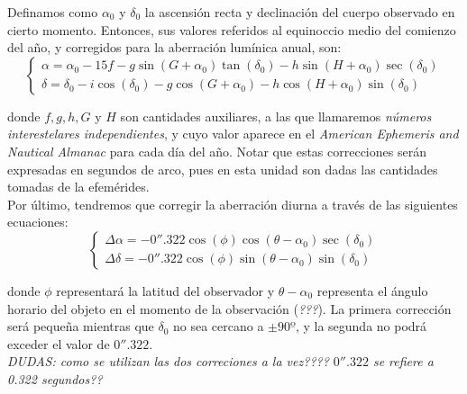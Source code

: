 \documentclass[11pt]{article}
\begin{document}
Definamos como $\alpha_0$ y $\delta_0$ la ascensión recta y declinación del cuerpo observado en cierto momento. Entonces, sus valores referidos al equinoccio medio del comienzo del año, y corregidos para la aberración lumínica anual, son:
\[
\left\{
\begin{array}{l}
	\alpha = \alpha_0 - 15f - g \sin(G+\alpha_0) \tan(\delta_0) - h \sin(H+\alpha_0) \sec(\delta_0)\\
	\delta = \delta_0 - i \cos(\delta_0) - g \cos(G+\alpha_0) - h \cos(H+\alpha_0) \sin(\delta_0)
\end{array}
\right.
\]

\noindent donde $f, g, h, G$ y $H$ son cantidades auxiliares, a las que llamaremos \textit{números interestelares independientes}, y cuyo valor aparece en el \textit{American Ephemeris and Nautical Almanac} para cada día del año. Notar que estas correcciones serán expresadas en segundos de arco, pues en esta unidad son dadas las cantidades tomadas de la efemérides.\\

Por último, tendremos que corregir la aberración diurna a través de las siguientes ecuaciones:
\[
\left\{
\begin{array}{l}
	\Delta \alpha = -0''.322 \cos(\phi) \cos(\theta - \alpha_0) \sec(\delta_0)\\
	\Delta \delta = -0''.322 \cos(\phi) \sin(\theta - \alpha_0) \sin(\delta_0)
\end{array}
\right.
\]

\noindent donde $\phi$ representará la latitud del observador y $\theta-\alpha_0$ representa el ángulo horario del objeto en el momento de la observación (\textit{???}). La primera corrección será pequeña mientras que $\delta_0$ no sea cercano a $\pm90º$, y la segunda no podrá exceder el valor de $0''.322$.\\

\textit{DUDAS: como se utilizan las dos correciones a la vez???? $0''.322$ se refiere a 0.322 segundos??}\\
\end{document}
